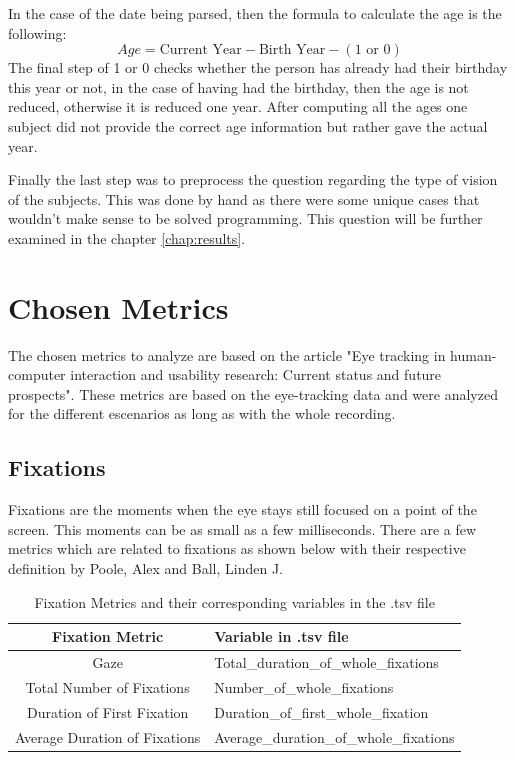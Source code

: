 In the case of the date being parsed, then the formula to calculate the age is the following:
\begin{equation}
    Age = \text{Current Year} - \text{Birth Year} - (1 \text{ or } 0)
\end{equation}
The final step of 1 or 0 checks whether the person has already had their birthday this year or not, 
in the case of having had the birthday, then the age is not reduced, otherwise it is reduced one year. 
After computing all the ages one subject did not provide the correct age information but rather gave the actual year.

Finally the last step was to preprocess the question regarding the type of vision of the subjects. This was done 
by hand as there were some unique cases that wouldn't make sense to be solved programming. This question will 
be further examined in the chapter \ref{chap:results}.
\section{Chosen Metrics}
The chosen metrics to analyze are based on the article "Eye tracking in human-computer interaction and usability 
research: Current status and future prospects"\cite{Poole2006}. These metrics are based on the eye-tracking data
and were analyzed for the different escenarios as long as with the whole recording. 
\subsection{Fixations}
Fixations are the moments when the eye stays still focused on a point of the screen. This moments can be as small
as a few milliseconds. There are a few metrics which are related to fixations as
shown below with their respective definition by Poole, Alex and Ball, Linden J.\cite{Poole2006}

\begin{table}[H]
\caption{Fixation Metrics and their corresponding variables in the .tsv file}
    \begin{tabularx}{\textwidth}{|c|X|}
        \hline
        \textbf{Fixation Metric} & \textbf{Variable in .tsv file} \\
        \hline
        Gaze & Total\_duration\_of\_whole\_fixations \\
        \hline
        Total Number of Fixations & Number\_of\_whole\_fixations \\
        \hline
        Duration of First Fixation & Duration\_of\_first\_whole\_fixation \\
        \hline
        Average Duration of Fixations & Average\_duration\_of\_whole\_fixations \\
        \hline
    \end{tabularx}
\end{table}


